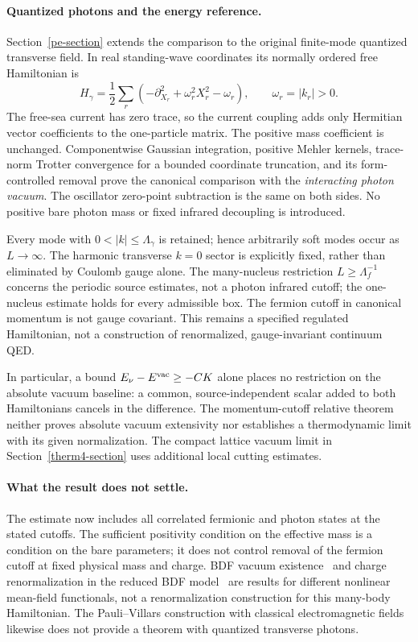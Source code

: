 \paragraph{Quantized photons and the energy reference.}
Section~\ref{pe-section} extends the comparison to the original
finite-mode quantized transverse field.  In real standing-wave
coordinates its normally ordered free Hamiltonian is
\[
 H_\gamma=\frac12\sum_r
 (-\partial_{X_r}^2+\omega_r^2X_r^2-\omega_r),\qquad
 \omega_r=|k_r|>0.
\]
The free-sea current has zero trace, so the current coupling adds only
Hermitian vector coefficients to the one-particle matrix.  The positive
mass coefficient is unchanged.  Componentwise Gaussian integration,
positive Mehler kernels, trace-norm Trotter convergence for a bounded
coordinate truncation, and its form-controlled removal prove the
canonical comparison with the \emph{interacting photon vacuum}.
The oscillator zero-point subtraction is the same on both sides.
No positive bare photon mass or fixed infrared decoupling is introduced.

Every mode with $0<|k|\leq\Lambda_\gamma$ is retained; hence arbitrarily
soft modes occur as $L\to\infty$.  The harmonic transverse $k=0$ sector
is explicitly fixed, rather than eliminated by Coulomb gauge alone.
The many-nucleus restriction $L\geq\Lambda_f^{-1}$ concerns the
periodic source estimates, not a photon infrared cutoff; the
one-nucleus estimate holds for every admissible box.  The fermion
cutoff in canonical momentum is not gauge covariant.  This remains
a specified regulated Hamiltonian, not a construction of renormalized,
gauge-invariant continuum QED.

In particular, a bound $E_\nu-E^{\rm vac}\geq-CK$ alone places no
restriction on the absolute vacuum baseline: a common, source-independent
scalar added to both Hamiltonians cancels in the difference.
The momentum-cutoff relative theorem neither proves absolute vacuum
extensivity nor establishes a thermodynamic limit with its given
normalization. The compact lattice vacuum limit in
Section~\ref{therm4-section} uses additional local cutting estimates.

\paragraph{What the result does not settle.}
The estimate now includes all correlated fermionic and photon states
at the stated cutoffs.  The sufficient positivity condition on the
effective mass is a condition on the bare parameters; it does not
control removal of the fermion cutoff at fixed physical mass and
charge.  BDF vacuum existence~\cite{HLS}
and charge renormalization in the reduced BDF model~\cite{GLS} are
results for different nonlinear mean-field functionals, not a
renormalization construction for this many-body Hamiltonian.
The Pauli--Villars construction with classical electromagnetic
fields~\cite{GHLS} likewise does not provide a theorem with quantized
transverse photons.

